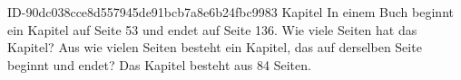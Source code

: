 \begin{exercise}
      {ID-90dc038cce8d557945de91bcb7a8e6b24fbc9983}
      {Kapitel}
  \ifproblem\problem
    In einem Buch beginnt ein Kapitel auf Seite \num{53} und endet auf Seite \num{136}.
    Wie viele Seiten hat das Kapitel?
  \fi
  \ifoutline\outline
    Aus wie vielen Seiten besteht ein Kapitel, das auf derselben Seite beginnt und endet?
  \fi
  \ifoutcome\outcome
    Das Kapitel besteht aus \num{84} Seiten.
  \fi
\end{exercise}
